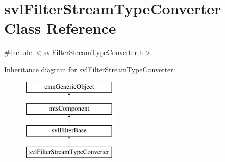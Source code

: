 \hypertarget{classsvl_filter_stream_type_converter}{}\section{svl\+Filter\+Stream\+Type\+Converter Class Reference}
\label{classsvl_filter_stream_type_converter}


{\ttfamily \#include $<$svl\+Filter\+Stream\+Type\+Converter.\+h$>$}

Inheritance diagram for svl\+Filter\+Stream\+Type\+Converter\+:\begin{figure}[H]
\begin{center}
\leavevmode
\includegraphics[height=4.000000cm]{da/d8d/classsvl_filter_stream_type_converter}
\end{center}
\end{figure}

